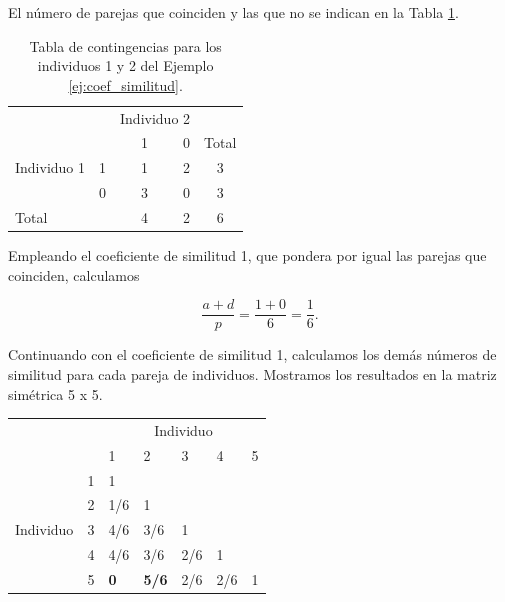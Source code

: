 \documentclass[a4paper, 20pt]{article}
\begin{document}
El número de parejas que coinciden y las que no se indican en la Tabla \ref{tab:contingencias-ej}.

\begin{table}[h]
  \centering
  \caption{Tabla de contingencias para los individuos 1 y 2 del Ejemplo \ref{ej:coef_similitud}.}
  \label{tab:contingencias-ej}
\resizebox{6.5cm}{!} {
  \begin{tabular}{lrrrrr}
    \toprule
\multicolumn{2}{l}{\multirow{2}{*}{}} & \multicolumn{2}{c}{Individuo 2} & \\\cmidrule{3-4}
\multicolumn{2}{l}{}                  & 1        &   0       & \multicolumn{2}{c}{Total}                        \\ \midrule
Individuo 1      & 1      & 1        &  2       & \multicolumn{2}{c}{3}                     \\
                              & 0      & 3        &    0       & \multicolumn{2}{c}{3}                     \\ \midrule
\multicolumn{2}{l}{Total}            & 4     & 2     & \multicolumn{2}{c}{6}\\
\bottomrule
\end{tabular}
}
\end{table}

Empleando el coeficiente de similitud 1, que pondera por igual las parejas que coinciden, calculamos

$$\frac{a+d}{p}=\frac{1+0}{6}=\frac{1}{6}. $$

Continuando con el coeficiente de similitud 1, calculamos los demás números de similitud para cada pareja de individuos. Mostramos los resultados en la matriz simétrica 5 x 5.

\begin{table}[H]
\centering
\resizebox{7.5cm}{!} {
\begin{tabular}{lllllll}
\multicolumn{2}{l}{\multirow{2}{*}{}}               & \multicolumn{5}{c}{Individuo}                  \\
\multicolumn{2}{l}{}                                & 1   & 2   & 3   & 4   & 5                      \\ \cline{3-3} \cline{7-7} 
\multirow{5}{*}{Individuo} & \multicolumn{1}{l|}{1} & 1   &     &     &     & \multicolumn{1}{l|}{}  \\
                           & \multicolumn{1}{l|}{2} & 1/6 & 1   &     &     & \multicolumn{1}{l|}{}  \\
                           & \multicolumn{1}{l|}{3} & 4/6 & 3/6 & 1   &     & \multicolumn{1}{l|}{}  \\
                           & \multicolumn{1}{l|}{4} & 4/6 & 3/6 & 2/6 & 1   & \multicolumn{1}{l|}{}  \\
                           & \multicolumn{1}{l|}{5} & \textbf{0}   & \textbf{5/6} & 2/6 & 2/6 & \multicolumn{1}{l|}{1} \\ \cline{3-3} \cline{7-7} 
\end{tabular}
}
\end{table}
\end{document}
